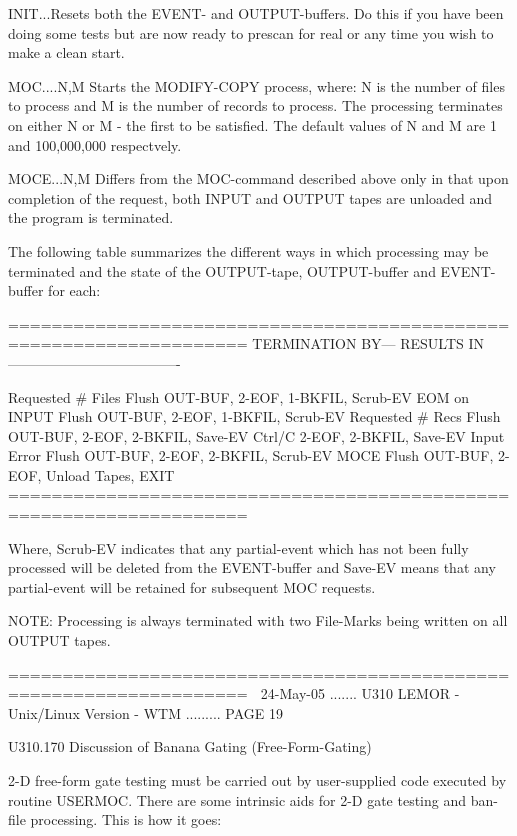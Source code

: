    INIT...Resets both the EVENT- and OUTPUT-buffers. Do this if you have  been
          doing  some  tests but are now ready to prescan for real or any time
          you wish to make a clean start.
 
   MOC....N,M Starts the MODIFY-COPY process, where: N is the number of  files
          to  process  and  M  is  the  number  of  records  to  process.  The
          processing terminates on either N or M - the first to be  satisfied.
          The default values of N and M are 1 and 100,000,000 respectvely.
 
   MOCE...N,M  Differs  from the MOC-command described above only in that upon
          completion of the request, both INPUT and OUTPUT tapes are  unloaded
          and the program is terminated.
 
          The  following  table  summarizes  the  different  ways   in   which
          processing  may  be  terminated  and  the  state of the OUTPUT-tape,
          OUTPUT-buffer and EVENT-buffer for each:
 
          ====================================================================
          TERMINATION BY---   RESULTS IN -------------------------------------
 
          Requested # Files   Flush OUT-BUF, 2-EOF, 1-BKFIL, Scrub-EV
          EOM on INPUT        Flush OUT-BUF, 2-EOF, 1-BKFIL, Scrub-EV
          Requested # Recs    Flush OUT-BUF, 2-EOF, 2-BKFIL,  Save-EV
          Ctrl/C                             2-EOF, 2-BKFIL,  Save-EV
          Input Error         Flush OUT-BUF, 2-EOF, 2-BKFIL, Scrub-EV
          MOCE                Flush OUT-BUF, 2-EOF, Unload Tapes, EXIT
          ====================================================================
 
          Where, Scrub-EV indicates that any partial-event which has not  been
          fully  processed  will  be deleted from the EVENT-buffer and Save-EV
          means that any partial-event will be  retained  for  subsequent  MOC
          requests.
 
          NOTE:  Processing  is  always  terminated  with two File-Marks being
          written on all OUTPUT tapes.
 
          ====================================================================
    
   24-May-05 ....... U310  LEMOR - Unix/Linux Version - WTM ......... PAGE  19
 
   U310.170  Discussion of Banana Gating (Free-Form-Gating)
 
   2-D free-form gate testing  must  be  carried  out  by  user-supplied  code
   executed  by  routine  USERMOC.  There are some intrinsic aids for 2-D gate
   testing and ban-file processing. This is how it goes:
 

